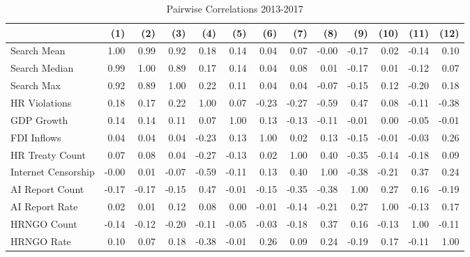 \begin{table}[ht]
\centering
\begin{tabular}{|l|rrrrrrrrrrrr|}
  \hline
 & (1) & (2) & (3) & (4) & (5) & (6) & (7) & (8) & (9) & (10) & (11) & (12) \\ 
  \hline
Search Mean & 1.00 & 0.99 & 0.92 & 0.18 & 0.14 & 0.04 & 0.07 & -0.00 & -0.17 & 0.02 & -0.14 & 0.10 \\ 
  Search Median & 0.99 & 1.00 & 0.89 & 0.17 & 0.14 & 0.04 & 0.08 & 0.01 & -0.17 & 0.01 & -0.12 & 0.07 \\ 
  Search Max & 0.92 & 0.89 & 1.00 & 0.22 & 0.11 & 0.04 & 0.04 & -0.07 & -0.15 & 0.12 & -0.20 & 0.18 \\ 
  HR Violations & 0.18 & 0.17 & 0.22 & 1.00 & 0.07 & -0.23 & -0.27 & -0.59 & 0.47 & 0.08 & -0.11 & -0.38 \\ 
  GDP Growth & 0.14 & 0.14 & 0.11 & 0.07 & 1.00 & 0.13 & -0.13 & -0.11 & -0.01 & 0.00 & -0.05 & -0.01 \\ 
  FDI Inflows & 0.04 & 0.04 & 0.04 & -0.23 & 0.13 & 1.00 & 0.02 & 0.13 & -0.15 & -0.01 & -0.03 & 0.26 \\ 
  HR Treaty Count & 0.07 & 0.08 & 0.04 & -0.27 & -0.13 & 0.02 & 1.00 & 0.40 & -0.35 & -0.14 & -0.18 & 0.09 \\ 
  Internet Censorship & -0.00 & 0.01 & -0.07 & -0.59 & -0.11 & 0.13 & 0.40 & 1.00 & -0.38 & -0.21 & 0.37 & 0.24 \\ 
  AI Report Count & -0.17 & -0.17 & -0.15 & 0.47 & -0.01 & -0.15 & -0.35 & -0.38 & 1.00 & 0.27 & 0.16 & -0.19 \\ 
  AI Report Rate & 0.02 & 0.01 & 0.12 & 0.08 & 0.00 & -0.01 & -0.14 & -0.21 & 0.27 & 1.00 & -0.13 & 0.17 \\ 
  HRNGO Count & -0.14 & -0.12 & -0.20 & -0.11 & -0.05 & -0.03 & -0.18 & 0.37 & 0.16 & -0.13 & 1.00 & -0.11 \\ 
  HRNGO Rate & 0.10 & 0.07 & 0.18 & -0.38 & -0.01 & 0.26 & 0.09 & 0.24 & -0.19 & 0.17 & -0.11 & 1.00 \\ 
   \hline
\end{tabular}
\caption{Pairwise Correlations 2013-2017} 
\end{table}
